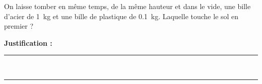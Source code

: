On laisse tomber en même temps, de la même hauteur et dans le vide, une bille d'acier de \qty{1}{kg} et une bille de plastique de \qty{0.1}{kg}. Laquelle touche le sol en premier ?

\choices

\noindent\textbf{Justification :} \hrulefill \\[2.5ex]
\rule{\linewidth}{0.4pt} \\[2.5ex]
\rule{\linewidth}{0.4pt}
\vfill
